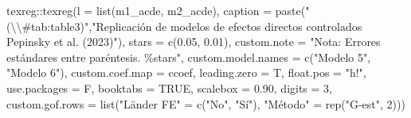 \documentclass[
  12pt,
  a4paper,
]{article}
\newenvironment{Shaded}{\begin{snugshade}}{\end{snugshade}}
\newcommand{\AttributeTok}[1]{\textcolor[rgb]{0.77,0.63,0.00}{#1}}
\newcommand{\ConstantTok}[1]{\textcolor[rgb]{0.00,0.00,0.00}{#1}}
\newcommand{\DecValTok}[1]{\textcolor[rgb]{0.00,0.00,0.81}{#1}}
\newcommand{\FloatTok}[1]{\textcolor[rgb]{0.00,0.00,0.81}{#1}}
\newcommand{\FunctionTok}[1]{\textcolor[rgb]{0.00,0.00,0.00}{#1}}
\newcommand{\NormalTok}[1]{#1}
\newcommand{\OtherTok}[1]{\textcolor[rgb]{0.56,0.35,0.01}{#1}}
\newcommand{\SpecialCharTok}[1]{\textcolor[rgb]{0.00,0.00,0.00}{#1}}
\newcommand{\StringTok}[1]{\textcolor[rgb]{0.31,0.60,0.02}{#1}}
\begin{document}
\begin{Shaded}
\begin{Highlighting}[]
\NormalTok{texreg}\SpecialCharTok{::}\FunctionTok{texreg}\NormalTok{(}\AttributeTok{l =} \FunctionTok{list}\NormalTok{(m1\_acde, m2\_acde),}
               \AttributeTok{caption =} \FunctionTok{paste}\NormalTok{(}\StringTok{"(}\SpecialCharTok{\textbackslash{}\textbackslash{}}\StringTok{\#tab:table3)"}\NormalTok{,}\StringTok{"Replicación de modelos de efectos directos controlados Pepinsky et al. (2023)"}\NormalTok{),}
               \AttributeTok{stars =} \FunctionTok{c}\NormalTok{(}\FloatTok{0.05}\NormalTok{, }\FloatTok{0.01}\NormalTok{),}
               \AttributeTok{custom.note =} \StringTok{"Nota: Errores estándares entre paréntesis. \%stars"}\NormalTok{,}
               \AttributeTok{custom.model.names =} \FunctionTok{c}\NormalTok{(}\StringTok{"Modelo 5"}\NormalTok{, }\StringTok{"Modelo 6"}\NormalTok{),}
               \AttributeTok{custom.coef.map =}\NormalTok{ ccoef,}
               \AttributeTok{leading.zero =}\NormalTok{ T,}
               \AttributeTok{float.pos =} \StringTok{"h!"}\NormalTok{,}
               \AttributeTok{use.packages =}\NormalTok{ F,}
               \AttributeTok{booktabs =} \ConstantTok{TRUE}\NormalTok{,}
               \AttributeTok{scalebox =} \FloatTok{0.90}\NormalTok{,}
               \AttributeTok{digits =} \DecValTok{3}\NormalTok{,}
               \AttributeTok{custom.gof.rows =} \FunctionTok{list}\NormalTok{(}\StringTok{"Länder FE"} \OtherTok{=} \FunctionTok{c}\NormalTok{(}\StringTok{"No"}\NormalTok{, }\StringTok{"Sí"}\NormalTok{),}
                                      \StringTok{"Método"} \OtherTok{=} \FunctionTok{rep}\NormalTok{(}\StringTok{"G{-}est"}\NormalTok{, }\DecValTok{2}\NormalTok{)))}
\end{Highlighting}
\end{Shaded}
\end{document}
